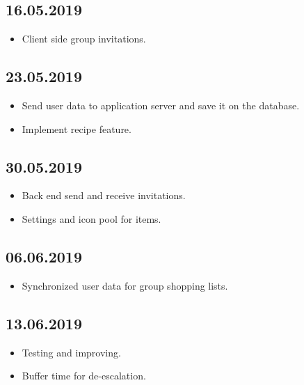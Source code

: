 \documentclass[12pt]{article}
\theoremstyle{definition}
\begin{document}
\subsection{16.05.2019}
\begin{itemize}
\item Client side group invitations.
\end{itemize}
\subsection{23.05.2019}
\begin{itemize}
\item Send user data to application server and save it on the database.
\item Implement recipe feature.
\end{itemize}
\subsection{30.05.2019}
\begin{itemize}
\item Back end send and receive invitations.
\item Settings and icon pool for items.
\end{itemize}
\subsection{06.06.2019}
\begin{itemize}
\item Synchronized user data for group shopping lists.
\end{itemize}
\subsection{13.06.2019}
\begin{itemize}
\item Testing and improving.
\item Buffer time for de-escalation. 
\end{itemize}
\end{document}
